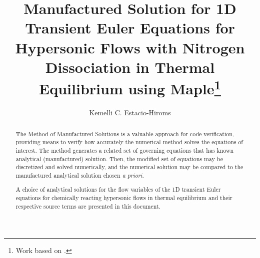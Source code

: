 \documentclass[10pt]{article}
\title{Manufactured Solution for 1D Transient Euler Equations for Hypersonic Flows with Nitrogen Dissociation in Thermal Equilibrium using Maple\footnote{Work based on \citet*{Roy2002,Kirk2009}.}}
\author{Kemelli C. Estacio-Hiroms}
\begin{document}
\maketitle

\begin{abstract}
The Method of Manufactured Solutions is a valuable approach for code verification, providing means to verify how accurately the numerical method solves the equations of interest. The method generates a related set of governing equations that has known analytical (manufactured) solution. Then, the modified set of equations may be discretized and solved numerically, and the numerical solution may be compared to the manufactured analytical solution  chosen \textit{a priori}.

A choice of analytical solutions for the flow variables of the 1D transient Euler equations for chemically reacting hypersonic flows in thermal equilibrium  and their respective source terms are presented in this document.
\end{abstract}
\end{document}
